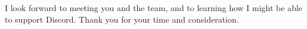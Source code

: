 I look forward to meeting you and the team, and to learning how I might be able to support Discord.
Thank you for your time and consideration.


\vspace{10pt}

\makeletterclosing


